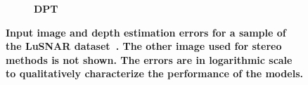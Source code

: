 \begin{figure}[b!]
\begin{subfigure}[b]{0.16\textwidth}
		\caption{\bfseries DPT}
	\end{subfigure}
	\caption{\bfseries Input image and depth estimation errors for a sample of the LuSNAR dataset~\cite{liu_lusnarlunar_2024}. The other image used for stereo methods is not shown. The errors are in logarithmic scale to qualitatively characterize the performance of the models.}
	\label{fig:depth_errors}
\end{figure}




